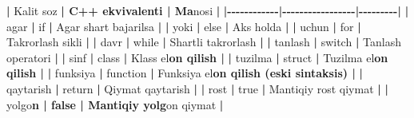 \documentclass[a4paper,11pt,twoside,openright]{book}
\newenvironment{Shaded}{\begin{snugshade}}{\end{snugshade}}
\newcommand{\CharTok}[1]{\textcolor[rgb]{0.31,0.60,0.02}{#1}}
\newcommand{\ErrorTok}[1]{\textcolor[rgb]{0.64,0.00,0.00}{\textbf{#1}}}
\newcommand{\NormalTok}[1]{#1}
\newcommand{\OperatorTok}[1]{\textcolor[rgb]{0.81,0.36,0.00}{\textbf{#1}}}
\begin{document}
\begin{Shaded}
\begin{Highlighting}[]
\OperatorTok{|}\NormalTok{ Kalit so}\CharTok{\textquotesingle{}z}\ErrorTok{ | C++ ekvivalenti | Ma}\CharTok{\textquotesingle{}}\NormalTok{nosi }\OperatorTok{|}
\OperatorTok{|{-}{-}{-}{-}{-}{-}{-}{-}{-}{-}{-}{-}|{-}{-}{-}{-}{-}{-}{-}{-}{-}{-}{-}{-}{-}{-}{-}{-}{-}|{-}{-}{-}{-}{-}{-}{-}{-}{-}|}
\OperatorTok{|} \ErrorTok{\textasciigrave{}}\NormalTok{agar}\ErrorTok{\textasciigrave{}} \OperatorTok{|} \ErrorTok{\textasciigrave{}}\NormalTok{if}\ErrorTok{\textasciigrave{}} \OperatorTok{|}\NormalTok{ Agar shart bajarilsa }\OperatorTok{|}
\OperatorTok{|} \ErrorTok{\textasciigrave{}}\NormalTok{yoki}\ErrorTok{\textasciigrave{}} \OperatorTok{|} \ErrorTok{\textasciigrave{}}\NormalTok{else}\ErrorTok{\textasciigrave{}} \OperatorTok{|}\NormalTok{ Aks holda }\OperatorTok{|}
\OperatorTok{|} \ErrorTok{\textasciigrave{}}\NormalTok{uchun}\ErrorTok{\textasciigrave{}} \OperatorTok{|} \ErrorTok{\textasciigrave{}}\NormalTok{for}\ErrorTok{\textasciigrave{}} \OperatorTok{|}\NormalTok{ Takrorlash sikli }\OperatorTok{|}
\OperatorTok{|} \ErrorTok{\textasciigrave{}}\NormalTok{davr}\ErrorTok{\textasciigrave{}} \OperatorTok{|} \ErrorTok{\textasciigrave{}}\NormalTok{while}\ErrorTok{\textasciigrave{}} \OperatorTok{|}\NormalTok{ Shartli takrorlash }\OperatorTok{|}
\OperatorTok{|} \ErrorTok{\textasciigrave{}}\NormalTok{tanlash}\ErrorTok{\textasciigrave{}} \OperatorTok{|} \ErrorTok{\textasciigrave{}}\NormalTok{switch}\ErrorTok{\textasciigrave{}} \OperatorTok{|}\NormalTok{ Tanlash operatori }\OperatorTok{|}
\OperatorTok{|} \ErrorTok{\textasciigrave{}}\NormalTok{sinf}\ErrorTok{\textasciigrave{}} \OperatorTok{|} \ErrorTok{\textasciigrave{}}\NormalTok{class}\ErrorTok{\textasciigrave{}} \OperatorTok{|}\NormalTok{ Klass e}\CharTok{\textquotesingle{}l}\ErrorTok{on qilish |}
\OperatorTok{|} \ErrorTok{\textasciigrave{}}\NormalTok{tuzilma}\ErrorTok{\textasciigrave{}} \OperatorTok{|} \ErrorTok{\textasciigrave{}}\NormalTok{struct}\ErrorTok{\textasciigrave{}} \OperatorTok{|}\NormalTok{ Tuzilma e}\CharTok{\textquotesingle{}l}\ErrorTok{on qilish |}
\OperatorTok{|} \ErrorTok{\textasciigrave{}}\NormalTok{funksiya}\ErrorTok{\textasciigrave{}} \OperatorTok{|} \ErrorTok{\textasciigrave{}}\NormalTok{function}\ErrorTok{\textasciigrave{}} \OperatorTok{|}\NormalTok{ Funksiya e}\CharTok{\textquotesingle{}l}\ErrorTok{on qilish (eski sintaksis) |}
\OperatorTok{|} \ErrorTok{\textasciigrave{}}\NormalTok{qaytarish}\ErrorTok{\textasciigrave{}} \OperatorTok{|} \ErrorTok{\textasciigrave{}}\NormalTok{return}\ErrorTok{\textasciigrave{}} \OperatorTok{|}\NormalTok{ Qiymat qaytarish }\OperatorTok{|}
\OperatorTok{|} \ErrorTok{\textasciigrave{}}\NormalTok{rost}\ErrorTok{\textasciigrave{}} \OperatorTok{|} \ErrorTok{\textasciigrave{}}\NormalTok{true}\ErrorTok{\textasciigrave{}} \OperatorTok{|}\NormalTok{ Mantiqiy rost qiymat }\OperatorTok{|}
\OperatorTok{|} \ErrorTok{\textasciigrave{}}\NormalTok{yolg}\CharTok{\textquotesingle{}o}\ErrorTok{n\textasciigrave{} | \textasciigrave{}false\textasciigrave{} | Mantiqiy yolg}\CharTok{\textquotesingle{}}\NormalTok{on qiymat }\OperatorTok{|}


\end{Highlighting}
\end{Shaded}
\end{document}
